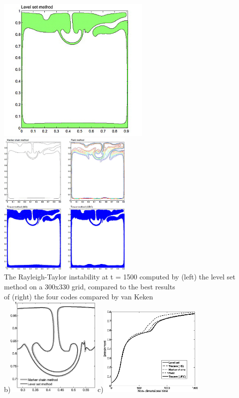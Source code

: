\begin{itemize}
\begin{center}
\includegraphics[height=7cm]{images/benchmark_vaks97/sunh10_a}
\includegraphics[height=7cm]{images/benchmark_vaks97/sunh10_e}\\
{\captionfont The Rayleigh-Taylor instability at t = 1500 computed by (left) 
the level set method on a 300x330 grid, compared to the best results\\ 
of (right) the four codes compared by van Keken \etal }\\
b)\includegraphics[width=4.5cm]{images/benchmark_vaks97/sunh10_b}
c)\includegraphics[width=5cm]{images/benchmark_vaks97/sunh10_c}

\end{center}
\end{itemize}
